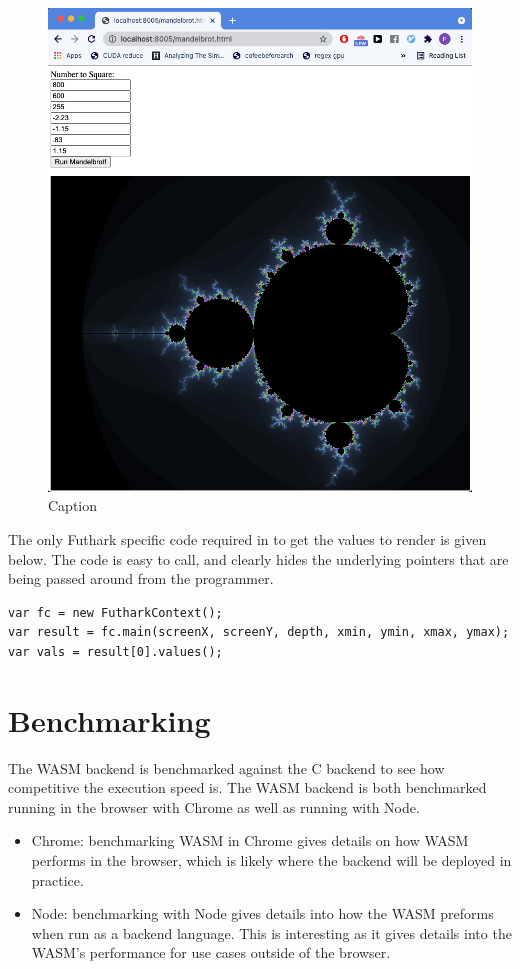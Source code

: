 \documentclass[11pt]{book}
\begin{document}
\begin{figure}[htbp]
    \centering
    \includegraphics[scale=0.2]{figures/mandelbrot.png}
    \caption{Caption}
    \label{fig:mandelbrot}
\end{figure}

The only Futhark specific code required in to get the values to render is given below. The code is easy to call, and clearly hides the underlying pointers that are being passed around from the programmer.

\begin{verbatim}
var fc = new FutharkContext();
var result = fc.main(screenX, screenY, depth, xmin, ymin, xmax, ymax);
var vals = result[0].values();
\end{verbatim}

\section{Benchmarking}

The WASM backend is benchmarked against the C backend to see how competitive the execution speed is. The WASM backend is both benchmarked running in the browser with Chrome as well as running with Node. 
\begin{itemize}
    \item Chrome: benchmarking WASM in Chrome gives details on how WASM performs in the browser, which is likely where the backend will be deployed in practice.
    \item Node: benchmarking with Node gives details into how the WASM preforms when run as a backend language. This is interesting as it gives details into the WASM's performance for use cases outside of the browser.
\end{itemize}
\end{document}
